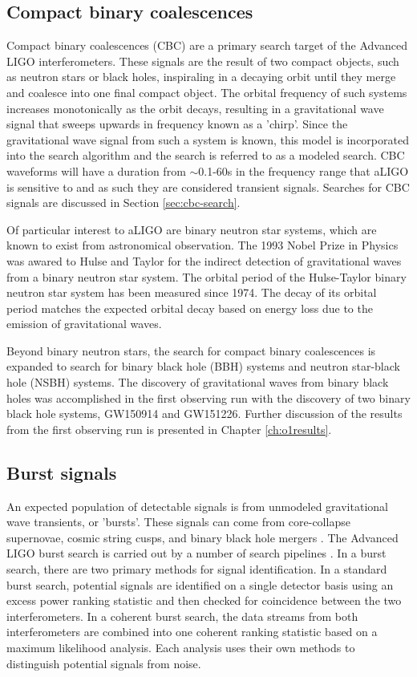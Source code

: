 \subsection{Compact binary coalescences}

Compact binary coalescences (CBC) are a primary search target of the 
Advanced LIGO interferometers. These signals are the result of two 
compact objects, such as neutron stars or black holes, inspiraling 
in a decaying orbit until they merge and coalesce into one final 
compact object. The orbital frequency of such systems increases 
monotonically as the orbit decays, resulting in a gravitational 
wave signal that sweeps upwards in frequency known as a 'chirp'. 
Since the gravitational wave signal from such a system is known, 
this model is incorporated into the search algorithm and the 
search is referred to as a modeled search. CBC waveforms will 
have a duration from $\sim$0.1-60s in the frequency range that
aLIGO is sensitive to and as such they are considered transient 
signals. Searches for CBC 
signals are discussed in Section \ref{sec:cbc-search}.

Of particular interest to aLIGO are binary neutron star systems, 
which are known to exist from astronomical 
observation. The 1993 Nobel Prize in Physics was awared to Hulse and 
Taylor for the indirect detection of gravitational waves from a binary 
neutron star system. The orbital 
period of the Hulse-Taylor binary neutron star system has been measured 
since 1974. The decay of its orbital period matches the 
expected orbital decay based on energy loss due to the emission of 
gravitational waves. 

Beyond binary neutron stars, the search for compact binary coalescences 
is expanded to search for binary black hole (BBH) systems and neutron star-black 
hole (NSBH) systems. The discovery of gravitational waves from binary black holes 
was accomplished in the 
first observing run with the discovery of two binary black hole systems, GW150914 
and GW151226. Further discussion of the results from the first observing run is 
presented in Chapter \ref{ch:o1results}.

\subsection{Burst signals}

An expected population of detectable signals is from unmodeled gravitational 
wave transients, or 'bursts'. These signals can come from core-collapse 
supernovae, cosmic string cusps, and binary black hole mergers 
\cite{Damour:2004kw,GW150914-BURST,lrr-2011-1}. The Advanced LIGO burst 
search is carried out by a number of search pipelines 
\cite{Lynch:2015,BayesWave,Klimenko:2007hd}. 
In a burst search, there are two primary methods for signal identification. 
In a standard burst search, potential signals are identified on a single detector 
basis using an excess power ranking statistic and then checked for coincidence 
between the two interferometers. In a coherent burst search, the data streams 
from both interferometers are combined into one coherent ranking statistic based 
on a maximum likelihood analysis. Each analysis uses their own methods to 
distinguish potential signals from noise.

